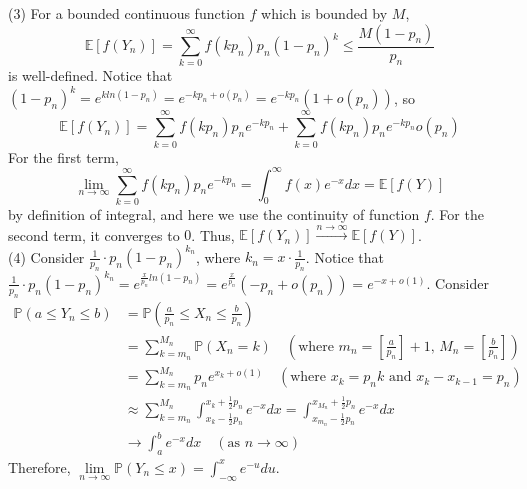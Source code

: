 \documentclass[12pt]{article}
\begin{document}
(3) For a bounded continuous function $f$ which is bounded by $M$, $$\mathbb{E}[f(Y_{n})]=\sum_{k=0}^{\infty}f(kp_{n})p_{n}(1-p_{n})^{k}\leqslant \frac{M(1-p_{n})}{p_{n}}$$ is well-defined.
Notice that $(1-p_{n})^{k}=e^{kln(1-p_{n})}=e^{-kp_{n}+o(p_{n})}=e^{-kp_{n}}(1+o(p_{n}))$, so $$\mathbb{E}[f(Y_{n})]=\sum_{k=0}^{\infty}f(kp_{n})p_{n}e^{-kp_{n}}+\sum_{k=0}^{\infty}f(kp_{n})p_{n}e^{-kp_{n}}o(p_{n})$$
For the first term, $$\lim_{n\rightarrow\infty}\sum_{k=0}^{\infty}f(kp_{n})p_{n}e^{-kp_{n}}=\int_{0}^{\infty}f(x)e^{-x}dx=\mathbb{E}[f(Y)]$$
by definition of integral, and here we use the continuity of function $f$. For the second term, it converges to $0$. Thus, $\mathbb{E}[f(Y_{n})]\xrightarrow{n\rightarrow\infty}\mathbb{E}[f(Y)]$.\\
(4) Consider $\frac{1}{p_{n}}\cdot p_{n}(1-p_{n})^{k_{n}}$, where $k_{n}=x\cdot\frac{1}{p_{n}}$. Notice that $\frac{1}{p_{n}}\cdot p_{n}(1-p_{n})^{k_{n}}=e^{\frac{x}{p_{n}}ln(1-p_{n})}=e^{\frac{x}{p_{n}}}(-p_{n}+o(p_{n}))=e^{-x+o(1)}$. Consider 
\begin{align*}
\mathbb{P}(a\leqslant Y_{n}\leqslant b) &= \mathbb{P}(\frac{a}{p_{n}}\leqslant X_{n}\leqslant \frac{b}{p_{n}})\\
&=\sum_{k=m_{n}}^{M_{n}}\mathbb{P}(X_{n}=k)\quad(\text{where $m_n=[\frac{a}{p_{n}}]+1$, $M_{n}=[\frac{b}{p_{n}}]$})\\
&= \sum_{k=m_{n}}^{M_{n}}p_{n}e^{x_{k}+o(1)}\quad(\text{where $x_{k}=p_{n}k$ and $x_{k}-x_{k-1}=p_{n}$})\\
&\approx\sum_{k=m_{n}}^{M_{n}}\int_{x_{k}-\frac{1}{2}p_{n}}^{x_{k}+\frac{1}{2}p_{n}}e^{-x}dx=\int_{x_{m_{n}}-\frac{1}{2}p_{n}}^{x_{M_{n}}+\frac{1}{2}p_{n}}e^{-x}dx\\
& \rightarrow \int_{a}^{b}e^{-x}dx\quad(\text{as $n\rightarrow\infty$})
\end{align*}
Therefore, $\lim\limits_{n\rightarrow\infty}\mathbb{P}(Y_{n}\leqslant x)=\int_{-\infty}^{x}e^{-u}du$.
\end{document}
